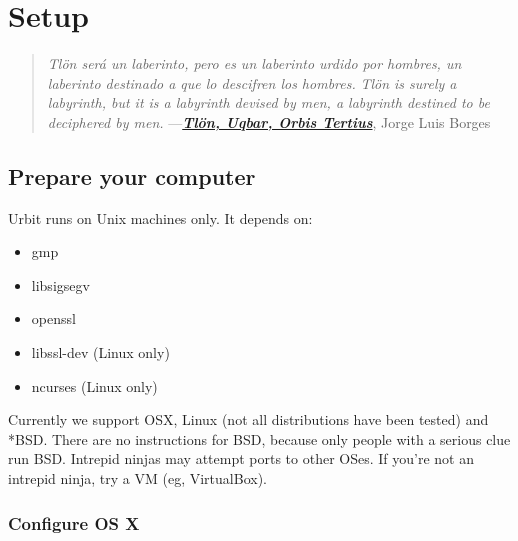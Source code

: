 \chapter{Setup}

\begin{quote}
\noindent \emph{Tlön será un laberinto, pero es un laberinto urdido por hombres, un
laberinto destinado a que lo descifren los hombres.}
\medskip \newline
\noindent \emph{Tlön is surely a labyrinth, but it is a labyrinth devised
by men, a labyrinth destined to be deciphered by men.}
\medskip \newline
\noindent ---\href{https://en.wikipedia.org/wiki/Tlon,_Uqbar,_Orbis_Tertius}{\textbf{\emph{Tlön, Uqbar, Orbis Tertius}}}, Jorge Luis Borges
\end{quote}

\section{Prepare your computer}

Urbit runs on Unix machines only.  It depends on:

\begin{itemize}
\item gmp
\item libsigsegv
\item openssl
\item libssl-dev (Linux only)
\item ncurses (Linux only)
\end{itemize}

Currently we support OSX, Linux (not all distributions have been
tested) and *BSD.  There are no instructions for BSD, because
only people with a serious clue run BSD.  Intrepid ninjas may
attempt ports to other OSes.  If you're not an intrepid ninja,
try a VM (eg, VirtualBox).

\subsection{Configure OS X}

